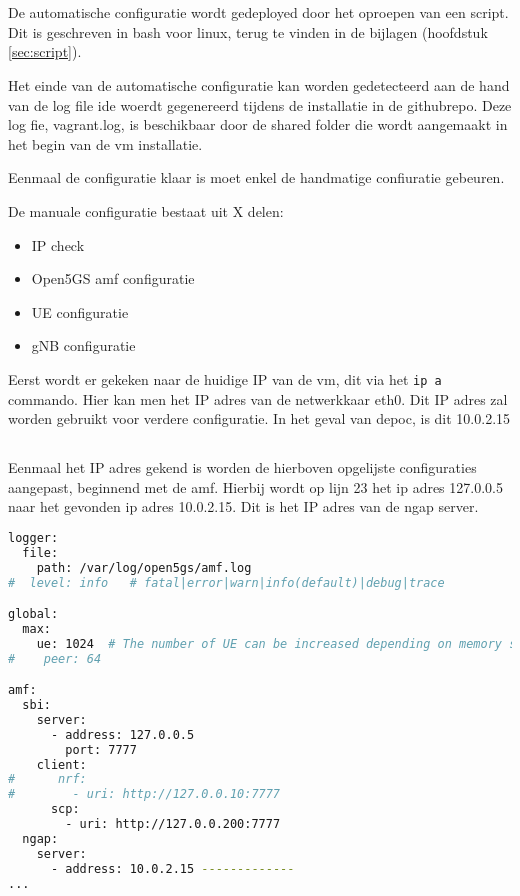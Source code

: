 \section{}%
\label{sec:Config}%

De automatische configuratie wordt gedeployed door het oproepen van een script. Dit is geschreven in bash voor linux, terug te vinden in de bijlagen (hoofdstuk \ref{sec:script}).

Het einde van de automatische configuratie kan worden gedetecteerd aan de hand van de log file ide woerdt gegenereerd tijdens de installatie in de githubrepo. Deze log fie, vagrant.log, is beschikbaar door de shared folder die wordt aangemaakt in het begin van de \gls{vm} installatie. 

Eenmaal de configuratie klaar is moet enkel de handmatige confiuratie gebeuren.

De manuale configuratie bestaat uit X delen:

\begin{itemize}
    \item IP check
    \item Open5GS amf configuratie
    \item UE configuratie
    \item gNB configuratie
\end{itemize}

Eerst wordt er gekeken naar de huidige IP van de \gls{vm}, dit via het \verb|ip a| commando. Hier kan men het IP adres van de netwerkkaar eth0. Dit IP adres zal worden gebruikt voor verdere configuratie. In het geval van de\gls{poc}, is dit 10.0.2.15

\subsection{}%
\label{sec:open5gs_amf}%

Eenmaal het IP adres gekend is worden de hierboven opgelijste configuraties aangepast, beginnend met de amf. Hierbij wordt op lijn 23 het ip adres 127.0.0.5 naar het gevonden ip adres 10.0.2.15. Dit is het IP  adres van de ngap server.

\begin{lstlisting}[language=sh, caption=Open5GS amf configuratie]
logger:
  file:
    path: /var/log/open5gs/amf.log
#  level: info   # fatal|error|warn|info(default)|debug|trace

global:
  max:
    ue: 1024  # The number of UE can be increased depending on memory size.
#    peer: 64

amf:
  sbi:
    server:
      - address: 127.0.0.5
        port: 7777
    client:
#      nrf:
#        - uri: http://127.0.0.10:7777
      scp:
        - uri: http://127.0.0.200:7777
  ngap:
    server:
      - address: 10.0.2.15 -------------
...
\end{lstlisting}

